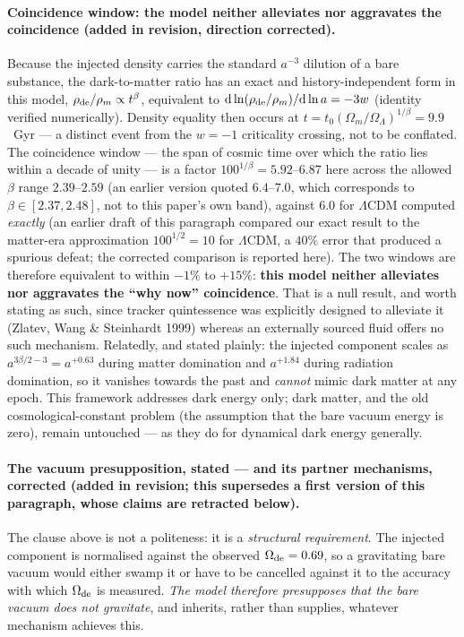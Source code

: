 \documentclass[11pt]{article}
\begin{document}
\paragraph{Coincidence window: the model neither alleviates nor aggravates the coincidence (added in revision, direction corrected).}
Because the injected density carries the standard $a^{-3}$ dilution of a bare substance, the
dark-to-matter ratio has an exact and history-independent form in this model,
$\rho_{\rm de}/\rho_m \propto t^{\beta}$, equivalent to $\mathrm{d}\ln(\rho_{\rm de}/\rho_m)/
\mathrm{d}\ln a = -3w$ (identity verified numerically). Density equality then occurs at
$t = t_0 (\Omega_m/\Omega_\Lambda)^{1/\beta} = 9.9$~Gyr --- a distinct event from the $w = -1$
criticality crossing, not to be conflated. The coincidence window --- the span
of cosmic time over which the ratio lies within a decade of unity --- is a factor $100^{1/\beta}
= 5.92$--$6.87$ here across the allowed $\beta$ range $2.39$--$2.59$ (an earlier version quoted $6.4$--$7.0$, which corresponds to $\beta \in [2.37, 2.48]$, not to this paper's own band), against $6.0$ for $\Lambda$CDM computed
\emph{exactly} (an earlier draft of this paragraph compared our exact result to the matter-era
approximation $100^{1/2} = 10$ for $\Lambda$CDM, a $40\%$ error that produced a spurious defeat;
the corrected comparison is reported here). The two windows are therefore equivalent to within
$-1\%$ to $+15\%$: \textbf{this model neither alleviates nor aggravates the ``why now'' coincidence}.
That is a null result, and worth stating as such, since tracker quintessence was explicitly
designed to alleviate it (Zlatev, Wang \& Steinhardt 1999) whereas an externally sourced fluid
offers no such mechanism. Relatedly, and stated
plainly: the injected component scales as $a^{3\beta/2-3} = a^{+0.63}$ during matter domination and
$a^{+1.84}$ during radiation domination, so it vanishes towards the past and \emph{cannot} mimic
dark matter at any epoch. This framework addresses dark energy only; dark matter, and the old
cosmological-constant problem (the assumption that the bare vacuum energy is zero), remain
untouched --- as they do for dynamical dark energy generally.

\paragraph{The vacuum presupposition, stated --- and its partner mechanisms, corrected
(added in revision; this supersedes a first version of this paragraph, whose claims are
retracted below).} The clause above is not a politeness: it is a \emph{structural requirement}.
The injected component is normalised against the observed $\Omega_{\rm de} = 0.69$, so a
gravitating bare vacuum would either swamp it or have to be cancelled against it to the accuracy
with which $\Omega_{\rm de}$ is measured. \emph{The model therefore presupposes that the bare
vacuum does not gravitate}, and inherits, rather than supplies, whatever mechanism achieves this.
\end{document}
